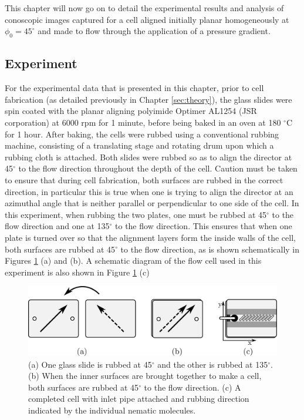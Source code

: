 This chapter will now go on to detail the experimental results and analysis of conoscopic images captured for a cell aligned initially planar homogeneously at $\phi_0=45^{\circ}$ and made to flow through the application of a pressure gradient.

\subsection{Experiment}
\label{sec:45_experiment}
For the experimental data that is presented in this chapter, prior to cell fabrication (as detailed previously in Chapter \ref{sec:theory}), the glass slides were spin coated with the planar aligning polyimide Optimer AL1254 (JSR corporation) at 6000 rpm for 1 minute, before being baked in an oven at 180 $^{\circ}$C for 1 hour. After baking, the cells were rubbed using a conventional rubbing machine, consisting of a translating stage and rotating drum upon which a rubbing cloth is attached. Both slides were rubbed so as to align the director at 45$^{\circ}$ to the flow direction throughout the depth of the cell. Caution must be taken to ensure that during cell fabrication, both surfaces are rubbed in the correct direction, in particular this is true when one is trying to align the director at an azimuthal angle that is neither parallel or perpendicular to one side of the cell. In this experiment, when rubbing the two plates, one must be rubbed at 45$^{\circ}$ to the flow direction and one at 135$^{\circ}$ to the flow direction. This ensures that when one plate is turned over so that the alignment layers form the inside walls of the cell, both surfaces are rubbed at 45$^{\circ}$ to the flow direction, as is shown schematically in Figures \ref{fig:rubbing} (a) and (b). A schematic diagram of the flow cell used in this experiment is also shown in Figure \ref{fig:rubbing} (c)

\begin{figure}
\begin{center}
\includegraphics{Figures/45/rubbing}
\end{center}
\caption[Rubbing directions for $\phi_0=45^{\circ}$]{\label{fig:rubbing}(a) One glass slide is rubbed at 45$^{\circ}$ and the other is rubbed at 135$^{\circ}$. (b) When the inner surfaces are brought together to make a cell, both surfaces are rubbed at 45$^{\circ}$ to the flow direction. (c) A completed cell with inlet pipe attached and rubbing direction indicated by the individual nematic molecules.}
\end{figure}

